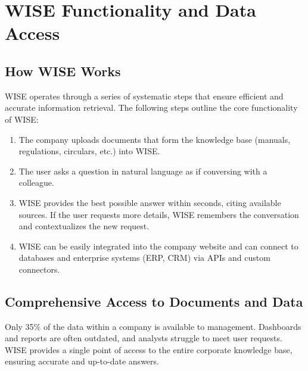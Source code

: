 \section{WISE Functionality and Data Access}

\subsection{How WISE Works}

WISE operates through a series of systematic steps that ensure efficient and accurate information retrieval. The following steps outline the core functionality of WISE:

\begin{enumerate}
    \item The company uploads documents that form the knowledge base (manuals, regulations, circulars, etc.) into WISE.
    \item The user asks a question in natural language as if conversing with a colleague.
    \item WISE provides the best possible answer within seconds, citing available sources. If the user requests more details, WISE remembers the conversation and contextualizes the new request.
    \item WISE can be easily integrated into the company website and can connect to databases and enterprise systems (ERP, CRM) via APIs and custom connectors.
\end{enumerate}

\subsection{Comprehensive Access to Documents and Data}

Only 35\% of the data within a company is available to management. Dashboards and reports are often outdated, and analysts struggle to meet user requests. WISE provides a single point of access to the entire corporate knowledge base, ensuring accurate and up-to-date answers.

